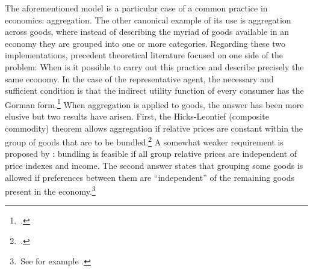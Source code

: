 \documentclass[english, a4paper, 12pt]{article}
\begin{document}
The aforementioned model is a particular case of a common practice in economics: aggregation. The other canonical example of its use is aggregation across goods, where instead of describing the myriad of goods available in an economy they are grouped into one or more categories. Regarding these two implementations, precedent theoretical literature focused on one side of the problem: When is it possible to carry out this practice and describe precisely the same economy. In the case of the representative agent, the necessary and sufficient condition is that the indirect utility function of every consumer has the Gorman form.\footnote{\,\cite{Gorman53}.} When aggregation is applied to goods, the answer has been more elusive but two results have arisen. First, the Hicks-Leontief (composite commodity) theorem allows aggregation if relative prices are constant within the group of goods that are to be bundled.\footnote{\,\cite{Leontief36, HicksBook}.} A somewhat weaker requirement is proposed by \cite{Lewbel96}: bundling is feasible if all group relative prices are independent of price indexes and income. The second answer states that grouping some goods is allowed if preferences between them are ``independent'' of the remaining goods present in the economy.\footnote{\,See for example \cite{GormanSeparability}.} 
\end{document}
